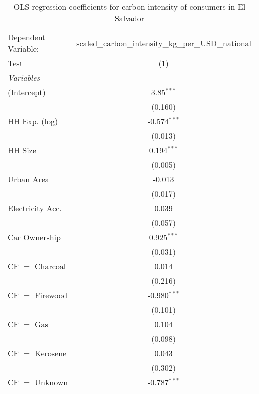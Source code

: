 
\begin{table}[htbp!]
   \centering
   \small
   \begin{adjustbox}{width = 1\textwidth, max height = 0.95\textheight, center}
      \begin{threeparttable}[b]
         \caption{\label{tab:OLS_1_SLV} OLS-regression coefficients for carbon intensity of consumers in El Salvador}
         \begin{tabular}{lc}
            \tabularnewline \midrule \midrule
            Dependent Variable: & scaled\_carbon\_intensity\_kg\_per\_USD\_national\\        
            Test                & (1)\\  
            \midrule
            \emph{Variables}\\
            (Intercept)         & 3.85$^{***}$\\   
                                & (0.160)\\   
            HH Exp. (log)       & -0.574$^{***}$\\   
                                & (0.013)\\   
            HH Size             & 0.194$^{***}$\\   
                                & (0.005)\\   
            Urban Area          & -0.013\\   
                                & (0.017)\\   
            Electricity Acc.    & 0.039\\   
                                & (0.057)\\   
            Car Ownership       & 0.925$^{***}$\\   
                                & (0.031)\\   
            CF $=$ Charcoal     & 0.014\\   
                                & (0.216)\\   
            CF $=$ Firewood     & -0.980$^{***}$\\   
                                & (0.101)\\   
            CF $=$ Gas          & 0.104\\   
                                & (0.098)\\   
            CF $=$ Kerosene     & 0.043\\   
                                & (0.302)\\   
            CF $=$ Unknown      & -0.787$^{***}$\\   

\end{tabular}
\end{threeparttable}
\end{adjustbox}
\end{table}
